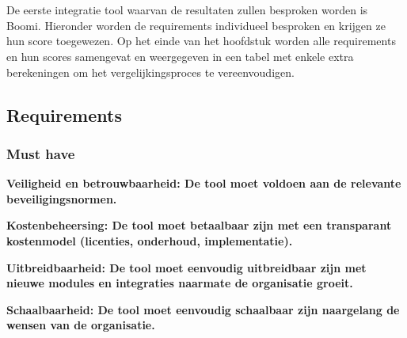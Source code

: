 \chapter{}
\label{ch:Boomi}

De eerste integratie tool waarvan de resultaten zullen besproken worden is Boomi. Hieronder worden de requirements individueel besproken en krijgen ze hun score toegewezen. Op het einde van het hoofdstuk worden alle requirements en hun scores samengevat en weergegeven in een tabel met enkele extra berekeningen om het vergelijkingsproces te vereenvoudigen.

\section{Requirements}%
\label{RequirementsBoomi}

\subsection{Must have}%
\label{MustHaveBoomi}

\textbf{Veiligheid en betrouwbaarheid: De tool moet voldoen aan de relevante beveiligingsnormen.}

\vspace{\baselineskip}

\vspace{\baselineskip}

\textbf{Kostenbeheersing: De tool moet betaalbaar zijn met een transparant kostenmodel (licenties, onderhoud, implementatie).}

\vspace{\baselineskip}



\vspace{\baselineskip}

\textbf{Uitbreidbaarheid: De tool moet eenvoudig uitbreidbaar zijn met nieuwe modules en integraties naarmate de organisatie groeit.}

\vspace{\baselineskip}



\vspace{\baselineskip}

\textbf{Schaalbaarheid: De tool moet eenvoudig schaalbaar zijn naargelang de wensen van de organisatie.}

\vspace{\baselineskip}



